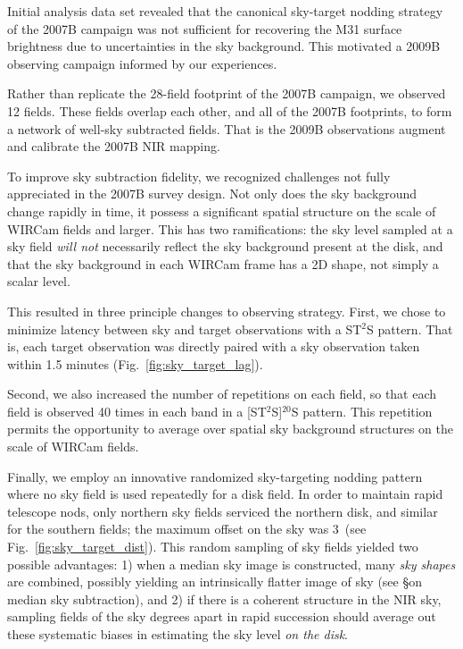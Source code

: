 \documentclass[iop]{emulateapj}
\newcommand{\Fig}[1]{Fig.~\ref{fig:#1}}  %
\begin{document}
Initial analysis data set revealed that the canonical sky-target nodding strategy of the 2007B campaign was not sufficient for recovering the M31 surface brightness due to uncertainties in the sky background. This motivated a 2009B observing campaign informed by our experiences.

Rather than replicate the 28-field footprint of the 2007B campaign, we observed 12 fields. These fields overlap each other, and all of the 2007B footprints, to form a network of well-sky subtracted fields. That is the 2009B observations augment and calibrate the 2007B NIR mapping.

To improve sky subtraction fidelity, we recognized challenges not fully appreciated in the 2007B survey design. Not only does the sky background change rapidly in time, it possess a significant spatial structure on the scale of WIRCam fields and larger. This has two ramifications: the sky level sampled at a sky field \emph{will not} necessarily reflect the sky background present at the disk, and that the sky background in each WIRCam frame has a 2D shape, not simply a scalar level.

This resulted in three principle changes to observing strategy. First, we chose to minimize latency between sky and target observations with a ST$^2$S pattern. That is, each target observation was directly paired with a sky observation taken within 1.5 minutes (\Fig{sky_target_lag}).

Second, we also increased the number of repetitions on each field, so that each field is observed 40 times in each band in a [ST$^2$S]$^{20}$S pattern. This repetition permits the opportunity to average over spatial sky background structures on the scale of WIRCam fields.

Finally, we employ an innovative randomized sky-targeting nodding pattern where no sky field is used repeatedly for a disk field. In order to maintain rapid telescope nods, only northern sky fields serviced the northern disk, and similar for the southern fields; the maximum offset on the sky was 3\arcdeg\ (see \Fig{sky_target_dist}). This random sampling of sky fields yielded two possible advantages: 1) when a median sky image is constructed, many \emph{sky shapes} are combined, possibly yielding an intrinsically flatter image of sky (see \S on median sky subtraction), and 2) if there is a coherent structure in the NIR sky, sampling fields of the sky degrees apart in rapid succession should average out these systematic biases in estimating the sky level \emph{on the disk}.
\end{document}
